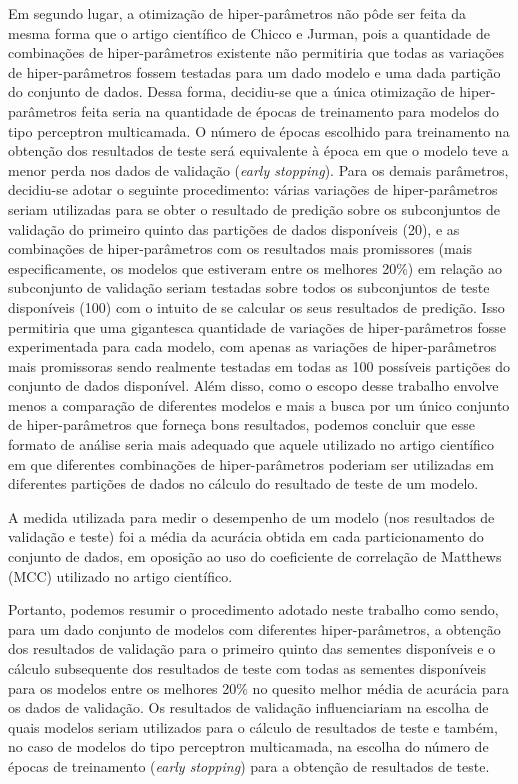 Em segundo lugar, a otimização de hiper-parâmetros não pôde ser feita da mesma forma que o artigo científico de Chicco e Jurman, pois a quantidade de combinações de hiper-parâmetros existente não permitiria que todas as variações de hiper-parâmetros fossem testadas para um dado modelo e uma dada partição do conjunto de dados. Dessa forma, decidiu-se que a única otimização de hiper-parâmetros feita seria na quantidade de épocas de treinamento para modelos do tipo perceptron multicamada. O número de épocas escolhido para treinamento na obtenção dos resultados de teste será equivalente à época em que o modelo teve a menor perda nos dados de validação (\textit{early stopping}). Para os demais parâmetros, decidiu-se adotar o seguinte procedimento: várias variações de hiper-parâmetros seriam utilizadas para se obter o resultado de predição sobre os subconjuntos de validação do primeiro quinto das partições de dados disponíveis (20), e as combinações de hiper-parâmetros com os resultados mais promissores (mais especificamente, os modelos que estiveram entre os melhores 20\%) em relação ao subconjunto de validação seriam testadas sobre todos os subconjuntos de teste disponíveis (100) com o intuito de se calcular os seus resultados de predição. Isso permitiria que uma gigantesca quantidade de variações de hiper-parâmetros fosse experimentada para cada modelo, com apenas as variações de hiper-parâmetros mais promissoras sendo realmente testadas em todas as 100 possíveis partições do conjunto de dados disponível. Além disso, como o escopo desse trabalho envolve menos a comparação de diferentes modelos e mais a busca por um único conjunto de hiper-parâmetros que forneça bons resultados, podemos concluir que esse formato de análise seria mais adequado que aquele utilizado no artigo científico em que diferentes combinações de hiper-parâmetros poderiam ser utilizadas em diferentes partições de dados no cálculo do resultado de teste de um modelo.

A medida utilizada para medir o desempenho de um modelo (nos resultados de validação e teste) foi a média da acurácia obtida em cada particionamento do conjunto de dados, em oposição ao uso do coeficiente de correlação de Matthews (MCC) utilizado no artigo científico.

Portanto, podemos resumir o procedimento adotado neste trabalho como sendo, para um dado conjunto de modelos com diferentes hiper-parâmetros, a obtenção dos resultados de validação para o primeiro quinto das sementes disponíveis e o cálculo subsequente dos resultados de teste com todas as sementes disponíveis para os modelos entre os melhores 20\% no quesito melhor média de acurácia para os dados de validação. Os resultados de validação influenciariam na escolha de quais modelos seriam utilizados para o cálculo de resultados de teste e também, no caso de modelos do tipo perceptron multicamada, na escolha do número de épocas de treinamento (\textit{early stopping}) para a obtenção de resultados de teste.

